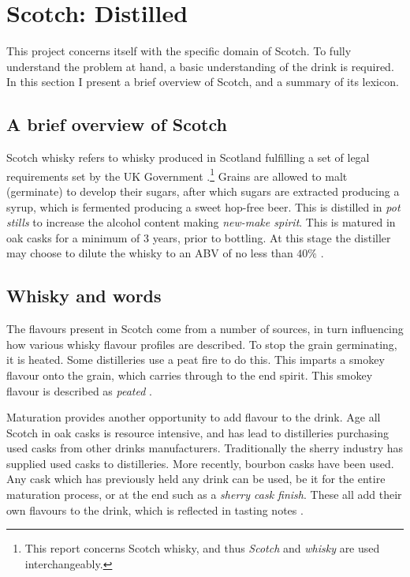 \section{Scotch: Distilled}\label{sec:whisky}
This project concerns itself with the specific domain of Scotch. To fully understand the problem at hand, a basic
understanding of the drink is required.  In this section I present a brief overview of Scotch, 
and a summary of its lexicon.

\subsection{A brief overview of Scotch}
Scotch whisky refers to whisky produced in Scotland fulfilling a set of legal requirements set by the UK Government 
\cite{legislation.gov.uk_2009}.\footnote{This report concerns Scotch whisky, and thus \emph{Scotch} and \emph{whisky} 
are used interchangeably.}  Grains are allowed to malt (germinate) to develop their sugars, after which sugars are
extracted producing a syrup, which is fermented producing a sweet hop-free beer.  This is
distilled in \emph{pot stills} to increase the alcohol content making \emph{new-make spirit}. This
is matured in oak casks for a minimum of 3 years, prior to bottling.  At this stage the distiller may choose
to dilute the whisky to an ABV of no less than $40\%$ \cite{Jacques2003, Pyke1965}.

\subsection{Whisky and words}
The flavours present in Scotch come from a number of sources, in turn influencing how various whisky
flavour profiles are described.  To stop the grain germinating, it is heated. Some distilleries use
a peat fire to do this.  This imparts a smokey flavour onto the grain, which carries through to the end spirit.
This smokey flavour is described as \emph{peated} \cite{Jacques2003, Bathgate2019}.

Maturation provides another opportunity to add flavour to the drink.  Age all Scotch in 
oak casks is resource intensive, and has lead to distilleries purchasing used casks from other drinks manufacturers.
Traditionally the sherry industry has supplied used casks to distilleries. More recently, bourbon casks have been 
used.  Any cask which has previously held any drink can be used, be it for the entire maturation process, or at the end
such as a \emph{sherry cask finish}.  These all add their own flavours to the drink, which is reflected in 
tasting notes \cite{Jacques2003, Mosedale1998}.